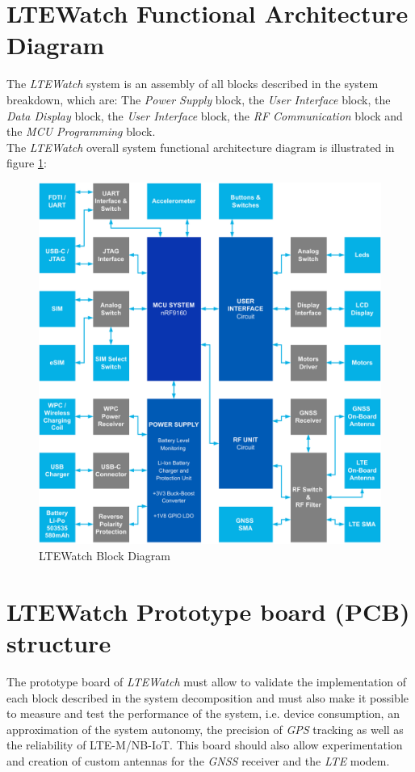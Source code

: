 \documentclass[report.tex]{subfiles}
\begin{document}
\pagebreak

\section{LTEWatch Functional Architecture Diagram} \label{sec:ltew_arch_dgr}
The \textit{LTEWatch} system is an assembly of all blocks described in the system breakdown, which are: The \textit{Power Supply} block, the \textit{User Interface} block, the \textit{Data Display} block, the \textit{User Interface} block, the \textit{RF Communication} block and the \textit{MCU Programming} block.\\

The \textit{LTEWatch} overall system functional architecture diagram is illustrated in figure \ref{fig:system_block}:

\begin{figure}[H]
	\centering
	\includegraphics[width=1\textwidth]{Include/Figure/Hardware/system_block.pdf}
	\caption{LTEWatch Block Diagram}
	\label{fig:system_block}
\end{figure}

\pagebreak

\section{LTEWatch Prototype board (PCB) structure} \label{sec:ltew_proto_brd_strct}
The prototype board of \textit{LTEWatch} must allow to validate the implementation of each block described in the system decomposition and must also make it possible to measure and test the performance of the system, i.e. device consumption, an approximation of the system autonomy, the precision of \textit{GPS} tracking as well as the reliability of LTE-M/NB-IoT. This board should also allow experimentation and creation of custom antennas for the \textit{GNSS} receiver and the \textit{LTE} modem.\\
\end{document}
